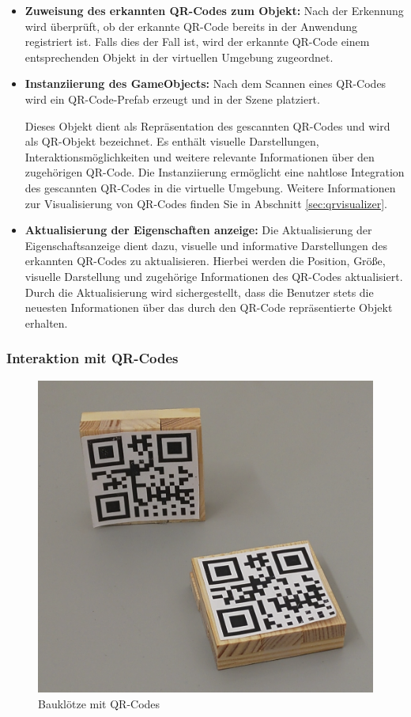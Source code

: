 \begin{itemize}
    \item \textbf{Zuweisung des erkannten QR-Codes zum Objekt:}
    Nach der Erkennung wird überprüft, ob der erkannte QR-Code bereits in der Anwendung registriert ist. Falls dies der Fall
    ist, wird der erkannte QR-Code einem entsprechenden Objekt in der virtuellen Umgebung zugeordnet.

    \item \textbf{Instanziierung des GameObjects:}
    Nach dem Scannen eines QR-Codes wird ein QR-Code-Prefab erzeugt und in der Szene platziert.

    Dieses Objekt dient als Repräsentation des gescannten QR-Codes und wird als QR-Objekt bezeichnet. Es enthält visuelle
    Darstellungen, Interaktionsmöglichkeiten und weitere relevante Informationen über den zugehörigen QR-Code. Die Instanziierung
    ermöglicht eine nahtlose Integration des gescannten QR-Codes in die virtuelle Umgebung. Weitere Informationen zur Visualisierung
    von QR-Codes finden Sie in Abschnitt \ref{sec:qrvisualizer}.

    \item \textbf{Aktualisierung der Eigenschaften anzeige:}
    Die Aktualisierung der Eigenschaftsanzeige dient dazu, visuelle und informative Darstellungen des erkannten QR-Codes zu
    aktualisieren. Hierbei werden die Position, Größe, visuelle Darstellung und zugehörige Informationen des QR-Codes aktualisiert.
    Durch die Aktualisierung wird sichergestellt, dass die Benutzer stets die neuesten Informationen über das durch den QR-Code
    repräsentierte Objekt erhalten.

\end{itemize}

\subsubsection{Interaktion mit QR-Codes}
\begin{figure}[H]
    \centering
    \includegraphics[scale=0.3, angle=0]{images/bauklotz}
    \caption{Bauklötze mit QR-Codes}
    \label{fig:bauklotz}
\end{figure}

